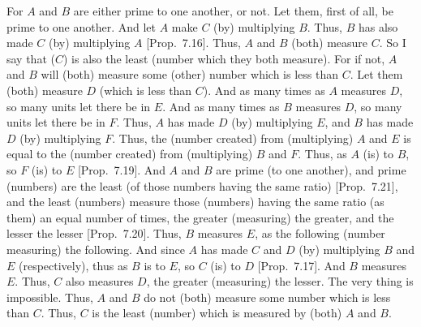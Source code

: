 \begin{Parallel}{}{}
{For $A$ and $B$ are either prime to one another, or not. Let them, first of all,
be prime to one another. And let $A$ make $C$ (by) multiplying $B$. Thus,
$B$ has also made $C$ (by) multiplying $A$ [Prop.~7.16]. Thus, $A$ and $B$ (both) measure $C$. So
I say that ($C$) is also the least (number which they both measure).
For if not, $A$ and $B$ will (both) measure some (other) number which is less than $C$. Let them (both) measure $D$ (which is less than $C$). And as many times
as $A$ measures $D$, so many units let there be in $E$. And as many times as $B$
measures $D$, so many units let there be in $F$. Thus, $A$ has made $D$ (by)
multiplying $E$, and $B$ has made $D$ (by) multiplying $F$. Thus, the
(number created) from (multiplying) $A$ and $E$ is equal to the (number created)
from (multiplying) $B$ and $F$. Thus, as $A$ (is) to $B$, so $F$ (is) to $E$ [Prop.~7.19]. And $A$ and $B$ are prime (to one another), and prime (numbers) are the least (of those numbers having
the same ratio)  [Prop.~7.21], and the
least (numbers) measure those (numbers) having the same
ratio (as them) an equal number of times, the greater (measuring) the greater,
and
the lesser the lesser [Prop.~7.20].
Thus, $B$ measures $E$, as the following (number measuring) the following.
And since $A$ has made $C$ and $D$ (by) multiplying $B$ and $E$ (respectively),
thus as $B$ is to $E$, so $C$ (is) to $D$ [Prop.~7.17]. 
And $B$ measures $E$. Thus, $C$ also measures $D$, the greater (measuring) the
lesser. The very thing is impossible. Thus, $A$ and $B$ do not (both) measure some
number which is less than $C$. Thus, $C$ is the least (number) which is
measured by (both) $A$ and $B$.

\epsfysize=1.5in
\centerline{}

}
\end{Parallel}
